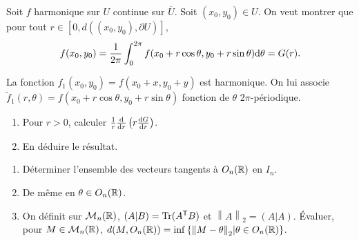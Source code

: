 \documentclass[12pt]{article}
\begin{document}
\begin{exercise}
	Soit $f$ harmonique sur $U$ continue sur $\overline{U}$. Soit $(x_0,y_0)\in U$. On veut montrer que pour tout $r\in[0,d((x_{0},y_{0}),\partial U)]$,
	\begin{equation}
		f(x_{0},y_{0})=\frac{1}{2\pi}\int_{0}^{2\pi}f(x_0+r\cos\theta,y_0+r\sin\theta)\mathrm{d}\theta=G(r).
	\end{equation}

	La fonction $f_1(x_0,y_0)=f(x_0+x,y_0+y)$ est harmonique. On lui associe $\widetilde{f}_1(r,\theta)=f(x_0+r\cos\theta,y_0+r\sin\theta)$ fonction de $\theta$ $2\pi$-périodique.
	\begin{enumerate}
		\item Pour $r>0$, calculer $\frac{1}{r}\frac{\mathrm{d}}{\mathrm{d} r}\left(r\frac{\mathrm{d} G}{\mathrm{d} r}\right)$.
		\item En déduire le résultat.
	\end{enumerate}
\end{exercise}

\begin{exercise}
	\phantom{}
	\begin{enumerate}
		\item Déterminer l'ensemble des vecteurs tangents à $O_n(\mathbb{R})$ en $I_n$.
		\item De même en $\theta\in O_n(\mathbb{R})$.
		\item On définit sur $\mathcal{M}_n(\mathbb{R})$, $(A|B)=\operatorname{Tr}(A^{\mathsf{T}}B)$ et $\left\lVert A\right\rVert_{2}=(A|A)$. Évaluer, pour $M\in\mathcal{M}_n(\mathbb{R})$, $d(M,O_n(\mathbb{R}))=\inf\left\lbrace\left\lVert M-\theta\right\rVert_{2}\middle| \theta\in O_n(\mathbb{R})\right\rbrace$.
	\end{enumerate}
\end{exercise}
\end{document}
